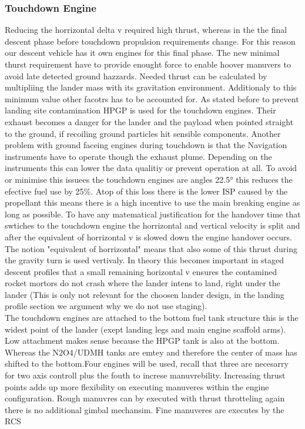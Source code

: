 \subsubsection{Touchdown Engine} 
Reducing the horrizontal delta v required high thrust, whereas in the the final descent phase before touchdown propulsion requirements change. For this reason our descent vehicle has it own engines for this final phase. The new minimal thurst requirement have to provide enought force to enable hoover manuvers to avoid late detected ground hazzards. Needed thrust can be calculated by multipliing the lander mass with its gravitation environment. Additionaly to this minimum value other facotrs has to be accounted for. As stated before to prevent landing site contamination HPGP is used for the touchdown engines. Their exhaust becomes a danger for the lander and the payload when pointed straight to the ground, if recoiling ground particles hit sensible components. Another problem with ground faceing engines during touchdown is that the Navigation instruments have to operate though the exhaust plume. Depending on the instruments this can lower the data qualitiy or prevent operation at all. To avoid or minimise this issuees the touchdown engines are angles 22.5° this reduces the efective fuel use by 25\%. Atop of this loss there is the lower ISP caused by the propellant this means there is a high incentive to use the main breaking engine as long as possible. To have any matematical justification for the handover time that swtiches to the touchdown engine the horrizontal and vertical velocity is split and after the equivalent of horrizontal v is slowed down the engine handover occurs. The notion "equivalent of horrizontal" means that also some of this thrust during the gravity turn is used vertivaly. In theory this becomes important in staged descent profiles that a small remaining horizontal v ensures the contamined rocket mortors do not crash where the lander intens to land, right under the lander (This is only not relevant for the choosen lander design, in the landing profile section we argument why we do not use staging).\\
The touchdown engines are attached to the bottom fuel tank structure this is the widest point of the lander (exept landing legs and main engine scaffold arms). Low attachment makes sense because the HPGP tank is also at the bottom. Whereas the N2O4/UDMH tanks are emtey and therefore the center of mass has shifted to the bottom.Four engines will be used, recall that three are necesarry for two axis controll plus the fouth to increse manuvrebility. Increasing thrust points adds up more flexibility on executing manuveres within the engine configuration. Rough manuvres can by executed with thrust throtteling again there is no additional gimbal mechansim. Fine manuveres are executes by the RCS\\
